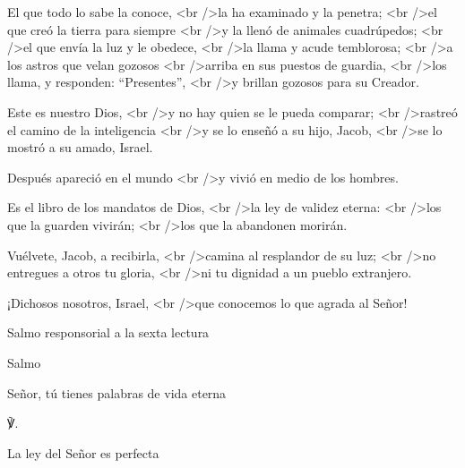 			\begin{readtalk}El que todo lo sabe la conoce, <br />la ha examinado y la penetra; <br />el que creó la tierra para siempre <br />y la llenó de animales cuadrúpedos; <br />el que envía la luz y le obedece, <br />la llama y acude temblorosa; <br />a los astros que velan gozosos <br />arriba en sus puestos de guardia, <br />los llama, y responden: “Presentes”, <br />y brillan gozosos para su Creador. \end{readtalk}
			
			\begin{readtalk}Este es nuestro Dios, <br />y no hay quien se le pueda comparar; <br />rastreó el camino de la inteligencia <br />y se lo enseñó a su hijo, Jacob, <br />se lo mostró a su amado, Israel. \end{readtalk}
			
			\begin{readtalk}Después apareció en el mundo <br />y vivió en medio de los hombres. \end{readtalk}
			
			\begin{readtalk}Es el libro de los mandatos de Dios, <br />la ley de validez eterna: <br />los que la guarden vivirán; <br />los que la abandonen morirán. \end{readtalk}
			
			\begin{readtalk}Vuélvete, Jacob, a recibirla, <br />camina al resplandor de su luz; <br />no entregues a otros tu gloria, <br />ni tu dignidad a un pueblo extranjero. \end{readtalk}
			
			\begin{readtalk}¡Dichosos nosotros, Israel, <br />que conocemos lo que agrada al Señor!\end{readtalk}
			
			\begin{readtitle}Salmo responsorial a la sexta lectura\end{readtitle}
			
			\begin{readbook}Salmo \end{readbook}
			
			\begin{readtheme}Señor, tú tienes palabras de vida eterna\end{readtheme}
			
			\begin{readbody}\begin{readred}℣.\end{readred} La ley del Señor es perfecta \end{readbody}
			
